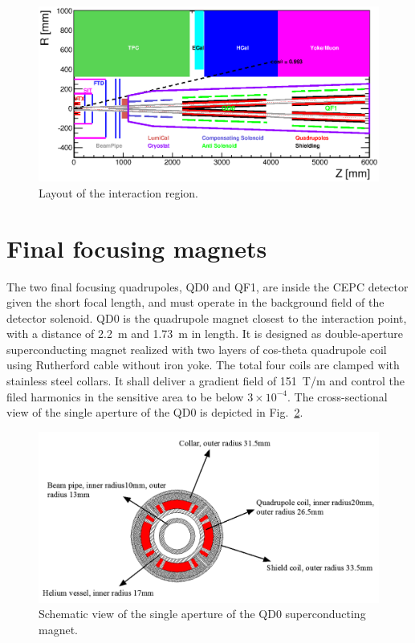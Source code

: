 \begin{figure}[h!]
	\centering
	\includegraphics[scale=0.80] {Figures/MDI/mdi_IR_layout.eps}
	\caption{Layout of the interaction region.}
	\label{fig:mdi_IR_layout}
\end{figure}


\section{Final focusing magnets}
The two final focusing quadrupoles, QD0 and QF1, are inside the CEPC detector given the short focal length, and must operate in the background field of the detector solenoid. QD0 is the quadrupole magnet closest to the interaction point, with a distance of 2.2~m and 1.73~m in length. It is designed as double-aperture superconducting magnet realized with two layers of cos-theta quadrupole coil using Rutherford cable without iron yoke. The total four coils are clamped with stainless steel collars. It shall deliver a gradient field of 151~T/m and control the filed harmonics in the sensitive area to be below $3\times 10^{-4}$. The cross-sectional view of the single aperture of the QD0 is depicted in Fig.~\ref{fig:mdi_QD0_Structure}.

\begin{figure}[h!]
	\centering
	\includegraphics[scale=0.60] {Figures/MDI/mdi_QD0_Structure.png}
	\caption{Schematic view of the single aperture of the QD0 superconducting magnet.}
	\label{fig:mdi_QD0_Structure}
\end{figure}


